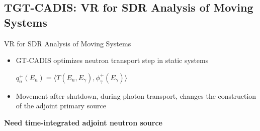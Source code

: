 \documentclass{beamer}
\begin{document}
%
\subsection{TGT-CADIS: VR for SDR Analysis of Moving Systems}
\begin{frame}{VR for SDR Analysis of Moving Systems}
	\begin{itemize}
		\item{GT-CADIS optimizes neutron transport step in static
			systems}
			\begin{center}
	$q^{+}_n(E_n) = \langle T(E_n, E_{\gamma}) ,
	\phi_{\gamma}^{+}(E_{\gamma}) \rangle$
			\end{center}
			\vspace{0.5cm}
		\item{Movement after shutdown, during photon transport, changes the construction
			of the adjoint primary source}
	\end{itemize}
	\vspace{1cm}
	\centering
		{\textbf{Need time-integrated adjoint neutron source}}

\end{frame}
\end{document}
